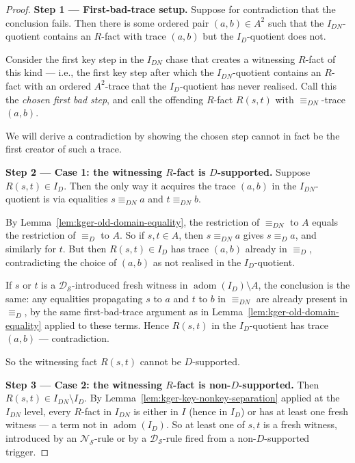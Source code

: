 \documentclass[10pt]{article}
\begin{document}
\begin{proof}

\smallskip\noindent\textbf{Step 1 --- First-bad-trace setup.}
Suppose for contradiction that the conclusion fails.  Then there is
some ordered pair \((a,b)\in A^2\) such that the \(I_{DN}\)-quotient
contains an \(R\)-fact with trace \((a,b)\) but the \(I_D\)-quotient
does not.

Consider the first key step in the \(I_{DN}\) chase that creates a
witnessing \(R\)-fact of this kind --- i.e., the first key step after
which the \(I_{DN}\)-quotient contains an \(R\)-fact with an ordered
\(A^2\)-trace that the \(I_D\)-quotient has never realised.  Call this
the \emph{chosen first bad step}, and call the offending \(R\)-fact
\(R(s,t)\) with \(\equiv_{DN}\)-trace \((a,b)\).

We will derive a contradiction by showing the chosen step cannot in
fact be the first creator of such a trace.

\smallskip\noindent\textbf{Step 2 --- Case 1: the witnessing
\(R\)-fact is \(D\)-supported.}
Suppose \(R(s,t)\in I_D\).  Then the only way it acquires the trace
\((a,b)\) in the \(I_{DN}\)-quotient is via equalities
\(s\equiv_{DN} a\) and \(t\equiv_{DN} b\).

By Lemma~\ref{lem:kger-old-domain-equality}, the restriction of
\(\equiv_{DN}\) to \(A\) equals the restriction of \(\equiv_D\) to
\(A\).  So if \(s,t\in A\), then \(s\equiv_{DN} a\) gives
\(s\equiv_D a\), and similarly for \(t\).  But then \(R(s,t)\in I_D\)
has trace \((a,b)\) already in \(\equiv_D\), contradicting the choice
of \((a,b)\) as not realised in the \(I_D\)-quotient.

If \(s\) or \(t\) is a \(\mathcal D_{\mathcal S}\)-introduced fresh
witness in \(\operatorname{adom}(I_D)\setminus A\), the conclusion is
the same: any equalities propagating \(s\) to \(a\) and \(t\) to \(b\)
in \(\equiv_{DN}\) are already present in \(\equiv_D\), by the same
first-bad-trace argument as in
Lemma~\ref{lem:kger-old-domain-equality} applied to these terms.
Hence \(R(s,t)\) in the \(I_D\)-quotient has trace \((a,b)\) ---
contradiction.

So the witnessing fact \(R(s,t)\) cannot be \(D\)-supported.

\smallskip\noindent\textbf{Step 3 --- Case 2: the witnessing
\(R\)-fact is non-\(D\)-supported.}
Then \(R(s,t)\in I_{DN}\setminus I_D\).  By
Lemma~\ref{lem:kger-key-nonkey-separation} applied at the \(I_{DN}\)
level, every \(R\)-fact in \(I_{DN}\) is either in \(I\) (hence in
\(I_D\)) or has at least one fresh witness --- a term not in
\(\operatorname{adom}(I_D)\).  So at least one of \(s,t\) is a fresh
witness, introduced by an \(\mathcal N_{\mathcal S}\)-rule or by a
\(\mathcal D_{\mathcal S}\)-rule fired from a non-\(D\)-supported
trigger.


\end{proof}
\end{document}
